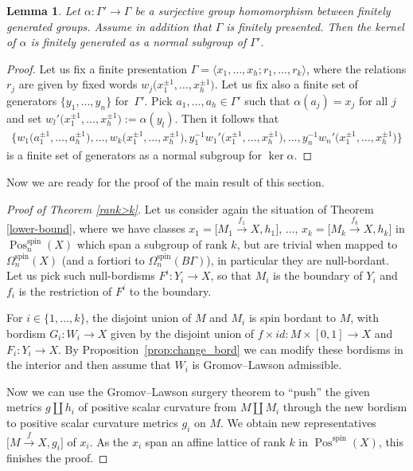 \documentclass[pdftex]{sigma}
\numberwithin{equation}{section}
\newtheorem{Lemma}[Theorem]{Lemma}
\newcommand{\disjointunion}{\amalg}
\DeclareMathOperator{\Pos}{Pos}
\DeclareMathOperator{\spin}{spin}
\begin{document}
\begin{Lemma}\label{ker-fg}
 Let $\alpha\colon \Gamma'\to\Gamma$ be a surjective group homomorphism
 between finitely generated groups. Assume in addition that $\Gamma$ is
 finitely presented. Then the kernel of $\alpha$ is finitely generated as a
 \emph{normal} subgroup of $\Gamma'$.
\end{Lemma}
\begin{proof}
 Let us fix a finite presentation $ \Gamma=\langle x_1,\dots, x_h ; r_1, \dots, r_k\rangle $, where the relations $r_j$ are given by fixed words $w_j\big(x_1^{\pm1},\dots, x_h^{\pm1}\big)$. Let us fix also a finite set of generators $\{ y_1,\dots, y_n\}$ for~$\Gamma'$.
 Pick $a_1,\dots,a_h\in\Gamma'$ such that $\alpha(a_j)=x_j$ for all $j$ and set
 $w_l'\big(x_1^{\pm1},\dots, x_h^{\pm1}\big):=\alpha(y_l)$. Then it follows
 that \begin{gather*}\big\{w_1\big(a_1^{\pm1},\dots, a_h^{\pm1}\big),\dots, w_k\big(x_1^{\pm1},\dots,
 x_h^{\pm1}\big),y^{-1}_1w_1'\big(x_1^{\pm1},\dots, x_h^{\pm1}\big), \dots,
 y^{-1}_nw_n'\big(x_1^{\pm1},\dots, x_h^{\pm1}\big)\!\big\}\end{gather*}
 is a finite set of generators
 as a normal subgroup for $\ker \alpha$.
\end{proof}

Now we are ready for the proof of the main result of this section.

\begin{proof}[Proof of Theorem \ref{rank>k}]
 Let us consider again the situation of Theorem \ref{lower-bound}, where we have
 classes $x_1=\big[M_1\xrightarrow{f_1}X,h_1\big]$,
 $\dots$, $x_k=\big[M_k\xrightarrow{f_k}X,h_k\big]$ in $\Pos^{\spin}_{n}(X)$ which span a subgroup of rank $k$,
 but are trivial when mapped to $\Omega^{\spin}_n(X)$ (and a fortiori to $\Omega^{\spin}_n(B\Gamma)$), in particular they are null-bordant.
 Let us pick such null-bordisms $F^i\colon Y_i\to X$, so that $M_i$ is the boundary of $Y_i$ and $f_i$ is the restriction of $F^i$ to the boundary.

 For $i\in\{1,\dots,k\}$, the disjoint union of $M$ and $M_i$ is spin bordant to $M$, with bordism $ G_i\colon W_i\to X$
 given by the disjoint union of $f\times id\colon M\times [0,1]\to X$ and
 $F_i\colon Y_i\to X$. By Proposition~\ref{prop:change_bord} we can modify
 these bordisms in the interior and then assume that
 $W_i$ is Gromov--Lawson admissible.

Now we can use the Gromov--Lawson surgery theorem
 to ``push'' the given metrics $g\disjointunion h_i$ of positive scalar curvature
 from $M\disjointunion M_i$ through the new
 bordism to positive scalar curvature metrics $g_i$ on $M$. We obtain new
 representatives $\big[M\xrightarrow{f} X, g_i\big]$ of $x_i$. As the $x_i$ span an
 affine lattice of rank $k$ in $\Pos^{\spin}(X)$, this finishes the
 proof.
\end{proof}
\end{document}
